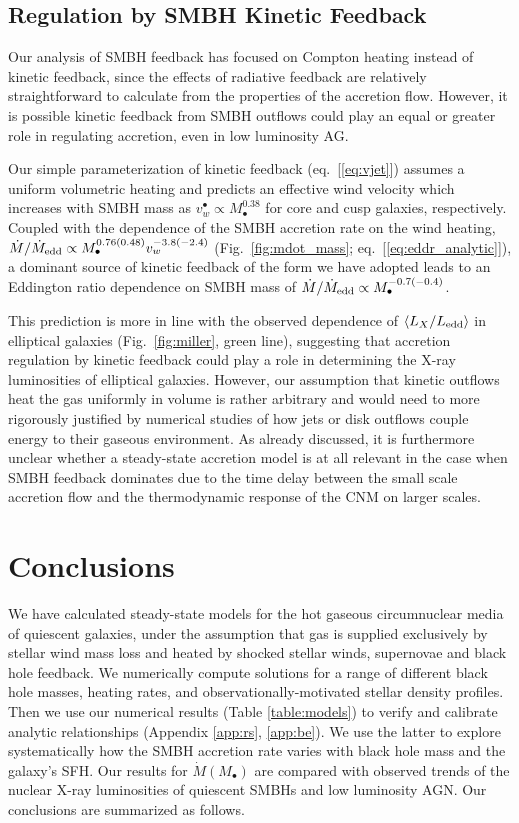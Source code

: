 \documentclass[usenatbib,fleqn]{mn2e}
\newcommand{\Mbh}[1][]{M_{\bullet#1}}
\begin{document}
\subsection{Regulation by SMBH Kinetic Feedback}
\label{sec:kinetic}

Our analysis of SMBH feedback has focused on Compton heating instead
of kinetic feedback, since the effects of radiative feedback are
relatively straightforward to calculate from the properties of the
accretion flow.  However, it is possible kinetic feedback from SMBH
outflows could play an equal or greater role in regulating accretion,
even in low luminosity AG.

Our simple parameterization of kinetic feedback (eq.~[\ref{eq:vjet}])
assumes a uniform volumetric heating and predicts an effective wind
velocity which increases with SMBH mass as $v_{w}^{\bullet} \propto
M_{\bullet}^{0.38}$ for core and cusp galaxies, respectively.
Coupled with the dependence of the SMBH accretion rate on the wind
heating, $\dot{M}/\dot{M}_{\rm edd} \propto
M_{\bullet}^{0.76(0.48)}v_{w}^{-3.8(-2.4)}$ (Fig.~\ref{fig:mdot_mass};
eq.~[\ref{eq:eddr_analytic}]), a dominant source of kinetic feedback
of the form we have adopted leads to an Eddington ratio dependence on
SMBH mass of $\dot{M}/\dot{M}_{\rm edd} \propto
M_{\bullet}^{-0.7(-0.4)}$.

This prediction is more in line with the observed dependence of
$\langle L_{X}/L_{\rm edd} \rangle$ in elliptical galaxies
(Fig.~\ref{fig:miller}, green line), suggesting that accretion
regulation by kinetic feedback could play a role in determining the
X-ray luminosities of elliptical galaxies.  However, our assumption
that kinetic outflows heat the gas uniformly in volume is rather
arbitrary and would need to more rigorously justified by numerical
studies of how jets or disk outflows couple energy to their gaseous
environment.  As already discussed, it is furthermore unclear whether
a steady-state accretion model is at all relevant in the case when
SMBH feedback dominates due to the time delay between the small scale
accretion flow and the thermodynamic response of the CNM on larger
scales.


\section{Conclusions}
\label{sec:conclusions}

We have calculated steady-state models for the hot gaseous
circumnuclear media of quiescent galaxies, under the assumption that
gas is supplied exclusively by stellar wind mass loss and heated by
shocked stellar winds, supernovae and black hole feedback.  We
numerically compute solutions for a range of different black hole
masses, heating rates, and observationally-motivated stellar density
profiles.  Then we use our numerical results (Table
\ref{table:models}) to verify and calibrate analytic
relationships (Appendix \ref{app:rs}, \ref{app:be}).  We use the
latter to explore systematically how the SMBH accretion rate varies
with black hole mass and the galaxy's SFH.  Our results for
$\dot{M}(\Mbh)$ are compared with observed trends of the nuclear X-ray
luminosities of quiescent SMBHs and low luminosity AGN.  Our
conclusions are summarized as follows.
\end{document}
